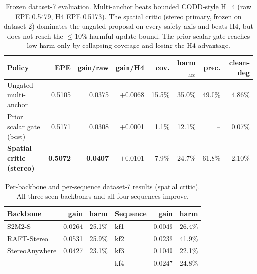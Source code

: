 
\begin{table}[t]
\centering
\caption{Frozen dataset-7 evaluation. Multi-anchor beats bounded CODD-style H=4
(raw EPE 0.5479, H4 EPE 0.5173). The spatial critic (stereo primary, frozen on
dataset 2) dominates the ungated proposal on every safety axis and beats H4, but
does not reach the $\leq$10\% harmful-update bound. The prior scalar gate reaches
low harm only by collapsing coverage and losing the H4 advantage.}
\label{tab:d7}
\begin{tabular}{lrrrrrrr}
\toprule
Policy & EPE & gain/raw & gain/H4 & cov. & harm$_{\text{acc}}$ & prec. & clean-deg \\
\midrule
Ungated multi-anchor & 0.5105 & 0.0375 & $+$0.0068 & 15.5\% & 35.0\% & 49.0\% & 4.86\% \\
Prior scalar gate (best) & 0.5171 & 0.0308 & $+$0.0001 & 1.1\% & 12.1\% & -- & 0.07\% \\
\textbf{Spatial critic (stereo)} & \textbf{0.5072} & \textbf{0.0407} & $\mathbf{+0.0101}$ & 7.9\% & 24.7\% & 61.8\% & 2.10\% \\
\bottomrule
\end{tabular}
\end{table}

\begin{table}[t]
\centering
\caption{Per-backbone and per-sequence dataset-7 results (spatial critic).
All three seen backbones and all four sequences improve.}
\label{tab:d7groups}
\begin{tabular}{lrr@{\hskip 2em}lrr}
\toprule
Backbone & gain & harm & Sequence & gain & harm \\
\midrule
S2M2-S         & 0.0264 & 25.1\% & kf1 & 0.0048 & 26.4\% \\
RAFT-Stereo    & 0.0531 & 25.9\% & kf2 & 0.0238 & 41.9\% \\
StereoAnywhere & 0.0427 & 23.1\% & kf3 & 0.1040 & 22.1\% \\
               &        &        & kf4 & 0.0247 & 24.8\% \\
\bottomrule
\end{tabular}
\end{table}

